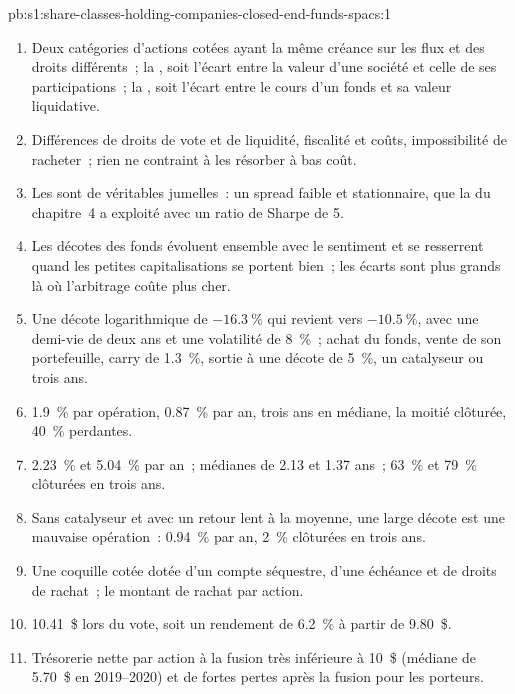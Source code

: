\begin{solution}{pb:s1:share-classes-holding-companies-closed-end-funds-spacs:1}
\begin{enumerate}
\item Deux catégories d'actions cotées ayant la même créance sur les flux et des droits différents~; la , soit l'écart entre la valeur d'une société et celle de ses participations~; la
, soit l'écart entre le cours d'un fonds et sa valeur liquidative.
\item Différences de droits de vote et de liquidité, fiscalité et coûts, impossibilité de racheter~; rien ne contraint à les résorber à bas coût.
\item Les  sont de véritables jumelles~: un spread faible et stationnaire, que la  du chapitre~4 a exploité avec un ratio de Sharpe de 5.
\item Les décotes des fonds évoluent ensemble avec le sentiment et se resserrent quand les petites capitalisations se portent bien~; les écarts sont plus grands là où l'arbitrage coûte plus cher.
\item Une décote logarithmique de $-16.3~\%$ qui revient vers $-10.5~\%$, avec une demi-vie de deux ans et une volatilité de 8~\%~; achat du fonds, vente de son portefeuille, carry de 1.3~\%,
sortie à une décote de 5~\%, un catalyseur ou trois ans.
\item 1.9~\% par opération, 0.87~\% par an, trois ans en médiane, la moitié clôturée, 40~\% perdantes.
\item 2.23~\% et 5.04~\% par an~; médianes de 2.13 et 1.37 ans~; 63~\% et 79~\% clôturées en trois ans.
\item Sans catalyseur et avec un retour lent à la moyenne, une large décote est une mauvaise opération~: 0.94~\% par an, 2~\% clôturées en trois ans.
\item Une coquille cotée dotée d'un compte séquestre, d'une échéance et de droits de rachat~; le montant de rachat par action.
\item 10.41~\$ lors du vote, soit un rendement de 6.2~\% à partir de 9.80~\$.
\item Trésorerie nette par action à la fusion très inférieure à 10~\$ (médiane de 5.70~\$ en 2019--2020) et de fortes pertes après la fusion pour les porteurs.

\end{enumerate}
\end{solution}
